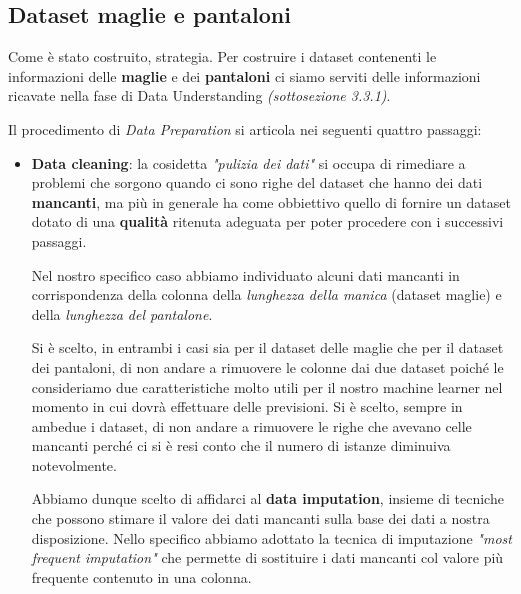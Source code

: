 \documentclass[a4paper, 11pt, oneside]{report}
\begin{document}
                \subsection{Dataset maglie e pantaloni}
                Come è stato costruito, strategia.
                Per costruire i dataset contenenti le informazioni delle \textbf{maglie} e dei \textbf{pantaloni} ci siamo serviti delle
                informazioni ricavate nella fase di Data Understanding \textit{(sottosezione 3.3.1)}.
                \par \noindent Il procedimento di \textit{Data Preparation} si articola nei seguenti quattro passaggi:
                \begin{itemize}
                    \item \textbf{Data cleaning}: la cosidetta \textit{"pulizia dei dati"} si occupa di
                    rimediare a problemi che sorgono quando ci sono righe del dataset che hanno dei dati \textbf{mancanti}, ma più
                    in generale ha come obbiettivo quello di fornire un dataset dotato di una \textbf{qualità} ritenuta adeguata
                    per poter procedere con i successivi passaggi.
                    \par \noindent Nel nostro specifico caso abbiamo individuato alcuni dati mancanti in corrispondenza della
                    colonna della \textit{lunghezza della manica} (dataset maglie) e della \textit{lunghezza del pantalone}.
                    \par \noindent Si è scelto, in entrambi i casi sia per il dataset delle maglie che per il dataset
                    dei pantaloni, di non andare a rimuovere le colonne dai due dataset poiché le consideriamo due caratteristiche
                    molto utili per il nostro machine learner nel momento in cui dovrà effettuare delle previsioni.
                    Si è scelto, sempre in ambedue i dataset, di non andare a rimuovere le righe che avevano celle mancanti
                    perché ci si è resi conto che il numero di istanze diminuiva notevolmente.
                    \par \noindent Abbiamo dunque scelto di affidarci al \textbf{data imputation}, insieme di tecniche che
                    possono stimare il valore dei dati mancanti sulla base dei dati a nostra disposizione.
                    Nello specifico abbiamo adottato la tecnica di imputazione \textit{"most frequent imputation"} che permette
                    di sostituire i dati mancanti col valore più frequente contenuto in una colonna.

\end{itemize}
\end{document}
